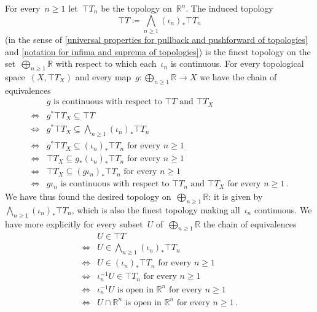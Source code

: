 For every~$n ≥ 1$ let~$\top{T}_n$ be the topology on~$ℝ^n$.
The induced topology
\[
	\top{T} ≔ ⋀_{n ≥ 1} {} (ι_n)_* \top{T}_n
\]
(in the sense of \cref{universal properties for pullback and pushforward of topologies} and \cref{notation for infima and suprema of topologies}) is the finest topology on the set~$⨁_{n ≥ 1} ℝ$ with respect to which each~$ι_n$ is continuous.
For every topological space~$(X, \top{T}_X)$ and every map~$g \colon ⨁_{n ≥ 1} ℝ \to X$ we have the chain of equivalences
\begin{align*}
	{}&
	\text{$g$ is continuous with respect to~$\top{T}$ and~$\top{T}_X$} \\
	\iff{}&
	g^* \top{T}_X ⊆ \top{T} \\
	\iff{}&
	\textstyle g^* \top{T}_X ⊆ ⋀_{n ≥ 1} {} (ι_n)_* \top{T}_n \\
	\iff{}&
	\text{$g^* \top{T}_X ⊆ (ι_n)_* \top{T}_n$ for every~$n ≥ 1$} \\
	\iff{}&
	\text{$\top{T}_X ⊆ g_* (ι_n)_* \top{T}_n$ for every~$n ≥ 1$} \\
	\iff{}&
	\text{$\top{T}_X ⊆ (g ι_n)_* \top{T}_n$ for every~$n ≥ 1$} \\
	\iff{}&
	\text{$g ι_n$ is continuous with respect to~$\top{T}_n$ and~$\top{T}_X$ for every~$n ≥ 1$} \,.
\end{align*}
We have thus found the desired topology on~$⨁_{n ≥ 1} ℝ$:
it is given by~$⋀_{n ≥ 1} {} (ι_n)_* \top{T}_n$, which is also the finest topology making all~$ι_n$ continuous.
We have more explicitly for every subset~$U$ of~$⨁_{n ≥ 1} ℝ$ the chain of equivalences
\begin{align*}
	{}&
	U ∈ \top{T} \\
	\iff{}&
	\textstyle\text{$U ∈ ⋀_{n ≥ 1} {} (ι_n)_* \top{T}_n$} \\
	\iff{}&
	\text{$U ∈ (ι_n)_* \top{T}_n$ for every~$n ≥ 1$} \\
	\iff{}&
	\text{$ι_n^{-1} U ∈ \top{T}_n$ for every~$n ≥ 1$} \\
	\iff{}&
	\text{$ι_n^{-1} U$ is open in~$ℝ^n$ for every~$n ≥ 1$} \\
	\iff{}&
	\text{$U ∩ ℝ^n$ is open in~$ℝ^n$ for every~$n ≥ 1$} \,.
\end{align*}
